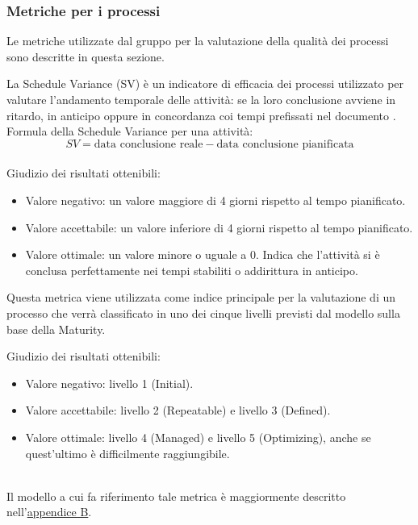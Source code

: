\documentclass[a4paper, titlepage]{article}
\begin{document}
\subsubsection{Metriche per i processi}
Le metriche utilizzate dal gruppo per la valutazione della qualità dei processi sono descritte in questa sezione.

\label{par:SV}
La Schedule Variance (SV) è un indicatore di efficacia dei processi utilizzato per valutare l'andamento temporale delle attività: se la loro conclusione avviene in ritardo, in anticipo oppure in concordanza coi tempi prefissati nel documento .
\newline Formula della Schedule Variance per una attività:
\begin{displaymath}
SV= \mbox{data conclusione reale} - \mbox{data conclusione pianificata}
\end{displaymath}
\\Giudizio dei risultati ottenibili:
\begin{itemize}
\item Valore negativo: un valore maggiore di 4 giorni rispetto al tempo pianificato.
\item Valore accettabile: un valore inferiore di 4 giorni rispetto al tempo pianificato.
\item Valore ottimale: un valore minore o uguale a 0. Indica che l'attività si è conclusa perfettamente nei tempi stabiliti o addirittura in anticipo. 
\end{itemize}

\label{par:cmm}
Questa metrica viene utilizzata come indice principale per la valutazione di un processo che verrà classificato in uno dei cinque livelli previsti dal modello sulla base della Maturity.
\par Giudizio dei risultati ottenibili:
\begin{itemize}
\item Valore negativo: livello 1 (Initial).
\item Valore accettabile: livello 2 (Repeatable) e livello 3 (Defined).
\item Valore ottimale: livello 4 (Managed) e livello 5 (Optimizing), anche se quest'ultimo è difficilmente raggiungibile.
\end{itemize}
\
\\ Il modello a cui fa riferimento tale metrica è maggiormente descritto nell'\hyperref[app:CMM]{appendice B}.
\end{document}
